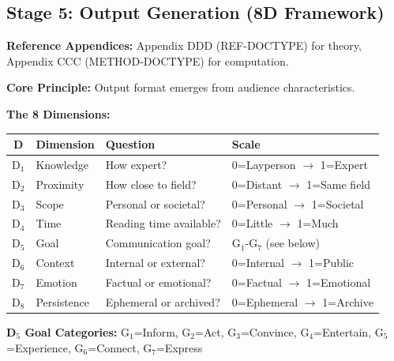 \begin{tcolorbox}[colback=yellow!5!white, colframe=yellow!75!black,
    title=\textbf{Stage 3 Deep Dive: Parameter Calibration Methods}]
\end{tcolorbox}

\subsection{Stage 5: Output Generation (8D Framework)}
\label{sec:dp-output}

\textbf{Reference Appendices:} Appendix DDD (REF-DOCTYPE) for theory, Appendix CCC (METHOD-DOCTYPE) for computation.

\begin{tcolorbox}[colback=purple!5!white, colframe=purple!75!black,
    title=\textbf{Stage 5 Deep Dive: 8D Document Framework}]

\textbf{Core Principle:} Output format emerges from audience characteristics.

\vspace{0.5em}
\textbf{The 8 Dimensions:}

\begin{center}
\small
\begin{tabular}{|c|l|l|l|}
\hline
\textbf{D} & \textbf{Dimension} & \textbf{Question} & \textbf{Scale} \\
\hline
\hline
D$_1$ & Knowledge & How expert? & 0=Layperson $\rightarrow$ 1=Expert \\
D$_2$ & Proximity & How close to field? & 0=Distant $\rightarrow$ 1=Same field \\
D$_3$ & Scope & Personal or societal? & 0=Personal $\rightarrow$ 1=Societal \\
D$_4$ & Time & Reading time available? & 0=Little $\rightarrow$ 1=Much \\
D$_5$ & Goal & Communication goal? & G$_1$-G$_7$ (see below) \\
D$_6$ & Context & Internal or external? & 0=Internal $\rightarrow$ 1=Public \\
D$_7$ & Emotion & Factual or emotional? & 0=Factual $\rightarrow$ 1=Emotional \\
D$_8$ & Persistence & Ephemeral or archived? & 0=Ephemeral $\rightarrow$ 1=Archive \\
\hline
\end{tabular}
\end{center}

\vspace{0.5em}
\textbf{D$_5$ Goal Categories:}
G$_1$=Inform, G$_2$=Act, G$_3$=Convince, G$_4$=Entertain, G$_5$=Experience, G$_6$=Connect, G$_7$=Express


\end{tcolorbox}
